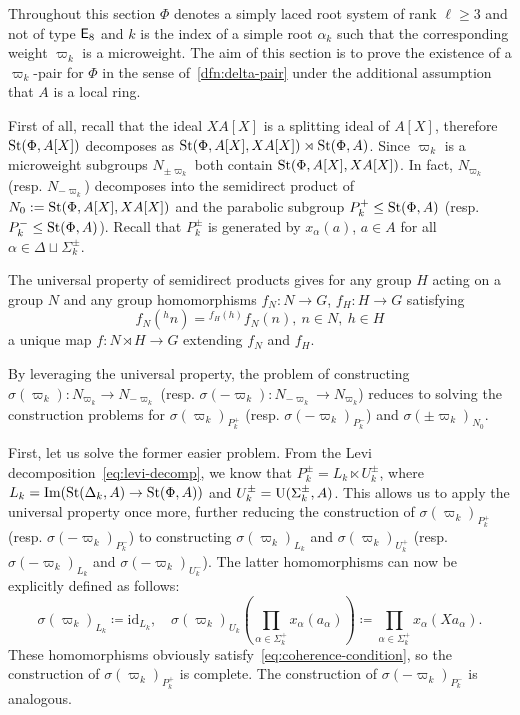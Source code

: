 Throughout this section $\Phi$ denotes a simply laced root system of rank $\ell \geq 3$ and not of type $\mathsf{E}_8$ and $k$ is the index of
 a simple root $\alpha_k$ such that the corresponding weight $\varpi_k$ is a microweight.
The aim of this section is to prove the existence of a $\varpi_k$-pair for $\Phi$ in the sense of~\cref{dfn:delta-pair}
 under the additional assumption that $A$ is a local ring.

First of all, recall that the ideal $XA[X]$ is a splitting ideal of $A[X]$, therefore
$\operatorname{St}(\Phi, A[X])$ decomposes as $\operatorname{St}(\Phi, A[X], XA[X]) \rtimes \operatorname{St}(\Phi, A)$.
Since $\varpi_k$ is a microweight subgroups $N_{\pm \varpi_k}$ both contain $\operatorname{St}(\Phi, A[X], XA[X])$.
In fact, $N_{\varpi_k}$ (resp. $N_{-\varpi_k}$) decomposes into the semidirect product of $N_0 := \operatorname{St}(\Phi, A[X], XA[X])$ and the parabolic subgroup $P_k^+ \leq \operatorname{St}(\Phi, A)$ (resp. $P_k^-\leq \operatorname{St}(\Phi, A)$).
Recall that $P_k^\pm$ is generated by $x_\alpha(a)$, $a \in A$ for all $\alpha \in \Delta \sqcup \Sigma^\pm_k$.

The universal property of semidirect products gives for any group $H$ acting on a group $N$
and any group homomorphisms $f_N\colon N \to G$, $f_H\colon H \to G$ satisfying
\begin{equation}
    \label{eq:coherence-condition} f_N({}^hn) = {}^{f_H(h)} f_N(n),\ n\in N,\ h\in H
\end{equation}
a unique map $f\colon N \rtimes H \to G$ extending $f_N$ and $f_H$.

By leveraging the universal property, the problem of constructing \( \sigma(\varpi_k) \colon N_{\varpi_k} \to N_{-\varpi_k} \)
(resp. $\sigma(-\varpi_k) \colon N_{-\varpi_k} \to N_{\varpi_k}$)
 reduces to solving the construction problems for \( \sigma(\varpi_k)_{P_k^+} \) (resp. $\sigma(-\varpi_k)_{P_k^-}$) and \( \sigma(\pm\varpi_k)_{N_0} \).

First, let us solve the former easier problem.
From the Levi decomposition~\eqref{eq:levi-decomp}, we know that \( P_k^\pm = L_k \ltimes U_k^\pm \), where \( L_k = \mathrm{Im}(\operatorname{St}(\Delta_k, A) \to \operatorname{St}(\Phi, A)) \) and \( U_k^\pm = \operatorname{U}(\Sigma_k^\pm, A) \).
This allows us to apply the universal property once more, further reducing the construction of \( \sigma(\varpi_k)_{P_k^+} \) (resp. $\sigma(-\varpi_k)_{P_k^-}$)
 to constructing \( \sigma(\varpi_k)_{L_k} \) and \( \sigma(\varpi_k)_{U_k^+} \) (resp. \( \sigma(-\varpi_k)_{L_k} \) and \( \sigma(-\varpi_k)_{U_k^-} \)).
The latter homomorphisms can now be explicitly defined as follows:
\begin{equation} \label{eq:sigma-Pk} \sigma(\varpi_k)_{L_k} \coloneqq \mathrm{id}_{L_k}, \quad \sigma(\varpi_k)_{U_k} \left(\prod_{\alpha \in \Sigma_k^+} x_\alpha(a_\alpha)\right) \coloneqq \prod_{\alpha \in \Sigma_k^+} x_\alpha(Xa_\alpha).\end{equation}
These homomorphisms obviously satisfy~\eqref{eq:coherence-condition}, so the construction of \( \sigma(\varpi_k)_{P_k^+} \) is complete.
The construction of \( \sigma(-\varpi_k)_{P_k^-} \) is analogous.

